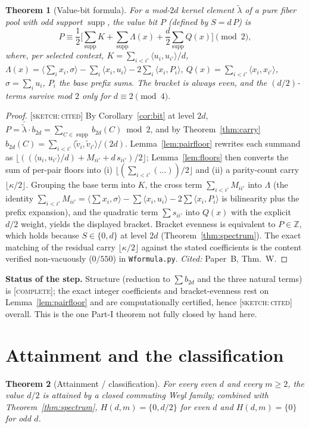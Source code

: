 \documentclass[11pt]{article}
\newtheorem{theorem}{Theorem}
\theoremstyle{definition}
\theoremstyle{remark}
\newcommand{\Z}{\mathbb{Z}}
\newcommand{\ip}[2]{\langle #1,#2\rangle}
\DeclareMathOperator{\supp}{supp}
\newcommand{\CO}{\textnormal{\textsc{[complete]}}}
\newcommand{\SK}{\textnormal{\textsc{[sketch:\,cited]}}}
\newcommand{\flag}[1]{\par\smallskip\noindent\textbf{Status of the step.} #1\par\smallskip}
\begin{document}
\begin{theorem}[Value-bit formula]\label{thm:valuebit}
For a mod-$2d$ kernel element $\tilde\lambda$ of a pure fiber pool with odd support $\supp$, the
value bit $P$ (defined by $S=d\,P$) is
\[
P\equiv\frac12\Big[\sum_{\supp}K+\sum_{\supp}\Lambda(x)+\frac d2\sum_{\supp}Q(x)\Big]\pmod2,
\]
where, per selected context, $K=\sum_{i<i'}\ip{u_i}{u_{i'}}/d$,
$\Lambda(x)=\ip{\textstyle\sum_ix_i}{\sigma}-\sum_i\ip{x_i}{u_i}-2\sum_i\ip{x_i}{P_i}$,
$Q(x)=\sum_{i<i'}\ip{x_i}{x_{i'}}$, $\sigma=\sum_iu_i$, $P_i$ the base prefix sums. The bracket is
always even, and the $(d/2)$-terms survive mod $2$ only for $d\equiv2\pmod4$.
\end{theorem}
\begin{proof}
\SK{} By Corollary~\ref{cor:bit} at level $2d$, $P=\bar{\tilde\lambda}\cdot b_{2d}=\sum_{C\in\supp}
b_{2d}(C)\bmod2$, and by Theorem~\ref{thm:carry} $b_{2d}(C)=\sum_{i<i'}\ip{\tilde v_i}{\tilde
v_{i'}}/(2d)$. Lemma~\ref{lem:pairfloor} rewrites each summand as
$\lfloor((\ip{u_i}{u_{i'}}/d)+M_{ii'}+d\,s_{ii'})/2\rfloor$; Lemma~\ref{lem:floors} then converts the
sum of per-pair floors into (i) $\lfloor(\sum_{i<i'}(\ldots))/2\rfloor$ and (ii) a parity-count carry
$\lfloor\kappa/2\rfloor$. Grouping the base term into $K$, the cross term $\sum_{i<i'}M_{ii'}$ into
$\Lambda$ (the identity $\sum_{i<i'}M_{ii'}=\ip{\sum x_i}{\sigma}-\sum\ip{x_i}{u_i}-2\sum\ip{x_i}{P_i}$
is bilinearity plus the prefix expansion), and the quadratic term $\sum s_{ii'}$ into $Q(x)$ with the
explicit $d/2$ weight, yields the displayed bracket. Bracket evenness is equivalent to $P\in\Z$,
which holds because $S\in\{0,d\}$ at level $2d$ (Theorem~\ref{thm:spectrum}). The exact matching of
the residual carry $\lfloor\kappa/2\rfloor$ against the stated coefficients is the content verified
non-vacuously ($0/550$) in \texttt{Wformula.py}. \emph{Cited:} Paper~B, Thm.~W.
\end{proof}
\flag{Structure (reduction to $\sum b_{2d}$ and the three natural terms) is \CO; the exact integer
coefficients and bracket-evenness rest on Lemma~\ref{lem:pairfloor} and are computationally
certified, hence \SK{} overall. This is the one Part-I theorem not fully closed by hand here.}

\section{Attainment and the classification}\label{sec:attain}

\begin{theorem}[Attainment / classification]\label{thm:attain}
For every even $d$ and every $m\ge2$, the value $d/2$ is attained by a closed commuting Weyl family;
combined with Theorem~\ref{thm:spectrum}, $H(d,m)=\{0,d/2\}$ for even $d$ and $H(d,m)=\{0\}$ for odd
$d$.
\end{theorem}
\end{document}

